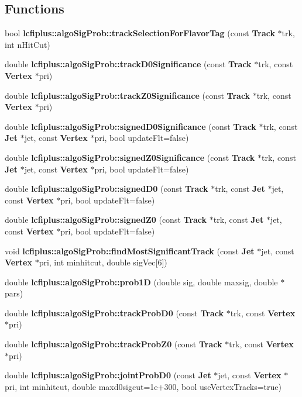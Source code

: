 \subsection*{Functions}
\begin{DoxyCompactItemize}
\item 
bool \textbf{ lcfiplus\+::algo\+Sig\+Prob\+::track\+Selection\+For\+Flavor\+Tag} (const \textbf{ Track} $\ast$trk, int n\+Hit\+Cut)
\item 
double \textbf{ lcfiplus\+::algo\+Sig\+Prob\+::track\+D0\+Significance} (const \textbf{ Track} $\ast$trk, const \textbf{ Vertex} $\ast$pri)
\item 
double \textbf{ lcfiplus\+::algo\+Sig\+Prob\+::track\+Z0\+Significance} (const \textbf{ Track} $\ast$trk, const \textbf{ Vertex} $\ast$pri)
\item 
double \textbf{ lcfiplus\+::algo\+Sig\+Prob\+::signed\+D0\+Significance} (const \textbf{ Track} $\ast$trk, const \textbf{ Jet} $\ast$jet, const \textbf{ Vertex} $\ast$pri, bool update\+Flt=false)
\item 
double \textbf{ lcfiplus\+::algo\+Sig\+Prob\+::signed\+Z0\+Significance} (const \textbf{ Track} $\ast$trk, const \textbf{ Jet} $\ast$jet, const \textbf{ Vertex} $\ast$pri, bool update\+Flt=false)
\item 
double \textbf{ lcfiplus\+::algo\+Sig\+Prob\+::signed\+D0} (const \textbf{ Track} $\ast$trk, const \textbf{ Jet} $\ast$jet, const \textbf{ Vertex} $\ast$pri, bool update\+Flt=false)
\item 
double \textbf{ lcfiplus\+::algo\+Sig\+Prob\+::signed\+Z0} (const \textbf{ Track} $\ast$trk, const \textbf{ Jet} $\ast$jet, const \textbf{ Vertex} $\ast$pri, bool update\+Flt=false)
\item 
void \textbf{ lcfiplus\+::algo\+Sig\+Prob\+::find\+Most\+Significant\+Track} (const \textbf{ Jet} $\ast$jet, const \textbf{ Vertex} $\ast$pri, int minhitcut, double sig\+Vec[6])
\item 
double \textbf{ lcfiplus\+::algo\+Sig\+Prob\+::prob1D} (double sig, double maxsig, double $\ast$pars)
\item 
double \textbf{ lcfiplus\+::algo\+Sig\+Prob\+::track\+Prob\+D0} (const \textbf{ Track} $\ast$trk, const \textbf{ Vertex} $\ast$pri)
\item 
double \textbf{ lcfiplus\+::algo\+Sig\+Prob\+::track\+Prob\+Z0} (const \textbf{ Track} $\ast$trk, const \textbf{ Vertex} $\ast$pri)
\item 
double \textbf{ lcfiplus\+::algo\+Sig\+Prob\+::joint\+Prob\+D0} (const \textbf{ Jet} $\ast$jet, const \textbf{ Vertex} $\ast$pri, int minhitcut, double maxd0sigcut=1e+300, bool use\+Vertex\+Tracks=true)

\end{DoxyCompactItemize}
